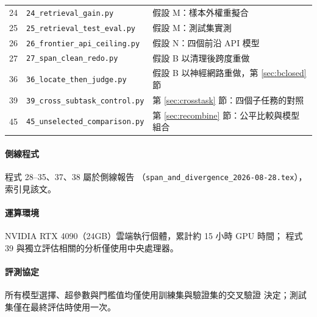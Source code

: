 \documentclass[11pt,a4paper]{ctexart}
\begin{document}
\begin{table}[h]
\begin{tabular}{@{}clp{6.8cm}@{}}
24 & \texttt{24\_retrieval\_gain.py}               & 假設 M：樣本外權重擬合 \\
25 & \texttt{25\_retrieval\_test\_eval.py}         & 假設 M：測試集實測 \\
26 & \texttt{26\_frontier\_api\_ceiling.py}        & 假設 N：四個前沿 API 模型 \\
27 & \texttt{27\_span\_clean\_redo.py}             & 假設 B 以清理後跨度重做 \\
36 & \texttt{36\_locate\_then\_judge.py}           & 假設 B 以神經網路重做，第 \ref{sec:bclosed} 節 \\
39 & \texttt{39\_cross\_subtask\_control.py}       & 第 \ref{sec:crosstask} 節：四個子任務的對照 \\
45 & \texttt{45\_unselected\_comparison.py}         & 第 \ref{sec:recombine} 節：公平比較與模型組合 \\
\bottomrule
\end{tabular}
\end{table}

\paragraph{側線程式} 程式 28--35、37、38 屬於側線報告
（\texttt{span\_and\_divergence\_2026-08-28.tex}），索引見該文。

\paragraph{運算環境} NVIDIA RTX 4090（24GB）雲端執行個體，累計約 15 小時 GPU 時間；
程式 39 與獨立評估相關的分析僅使用中央處理器。

\paragraph{評測協定} 所有模型選擇、超參數與門檻值均僅使用訓練集與驗證集的交叉驗證
決定；測試集僅在最終評估時使用一次。
\end{document}
